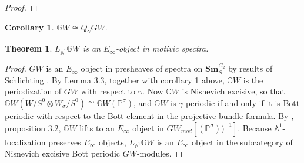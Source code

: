 \documentclass[draftthesis,tocnosub,noragright,centerchapter,10pt]{uiucthesis2009}
\newcommand{\Z}{\mathbb Z}
\newcommand{\mbb}{\mathbb}
\newcommand{\Sm}[1]{\mathbf{Sm}_{#1}}
\theoremstyle{plain}
\newtheorem{theorem}[lemma]{Theorem}
\theoremstyle{definition}
\newtheorem{corollary}[lemma]{Corollary}
\begin{document}
\begin{proof}

 \end{proof}

\begin{corollary}\label{cor:GW_per}
$\mbb GW \cong Q_\gamma GW$.
\end{corollary}

\begin{theorem}\label{thm:GW_Einfty}
$L_{\mbb A^1}\mbb GW$ is an $E_\infty$-object in motivic spectra.
\end{theorem}

\begin{proof}
$GW$ is an $E_\infty$ object in presheaves of spectra on
$\Sm{S}^{C_2}$ by results of Schlichting \cite{Schder}. By
\cite{cdhdesc} Lemma 3.3, together with corollary \ref{cor:GW_per}
above, $\mbb GW$ is the periodization of $GW$ with respect to
$\gamma$. Now $\mbb GW$ is Nisnevich excisive, so that $\mbb GW(W/S^0
\otimes W_\sigma/S^0) \cong \mbb GW(\mbb P^\sigma)$, and $\mbb GW$ is
$\gamma$ periodic if and only if it is Bott periodic with respect to
the Bott element in the projective bundle formula. By \cite{cdhdesc}, proposition 3.2, $\mbb GW$ lifts to an
$E_\infty$ object in $GW_{mod}[(\mbb P^\sigma))^{-1}]$. Because $\mbb A^1$-localization preserves
$E_\infty$ objects, $L_{\mbb A^1}\mbb GW$ is an $E_\infty$ object in
the subcategory of Nisnevich excisive Bott periodic
$GW$-modules. 
\end{proof}
\end{document}
